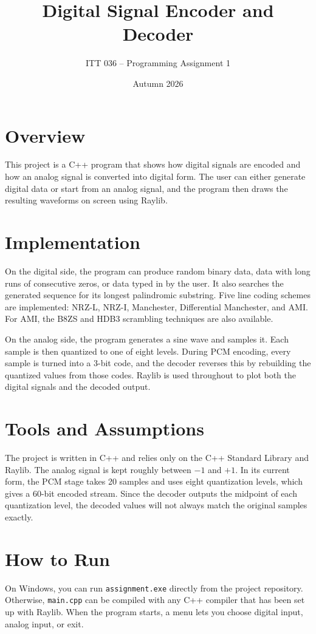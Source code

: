 \documentclass[10pt,a4paper]{article}
\title{\vspace{-1.5em}Digital Signal Encoder and Decoder}
\author{ITT 036 -- Programming Assignment 1}
\date{Autumn 2026}
\begin{document}
\maketitle
\vspace{-2em}

\section*{Overview}
This project is a C++ program that shows how digital signals are encoded
and how an analog signal is converted into digital form. The user can
either generate digital data or start from an analog signal, and the
program then draws the resulting waveforms on screen using Raylib.

\section*{Implementation}
On the digital side, the program can produce random binary data, data
with long runs of consecutive zeros, or data typed in by the user. It
also searches the generated sequence for its longest palindromic
substring. Five line coding schemes are implemented: NRZ-L, NRZ-I,
Manchester, Differential Manchester, and AMI. For AMI, the B8ZS and
HDB3 scrambling techniques are also available.

On the analog side, the program generates a sine wave and samples it.
Each sample is then quantized to one of eight levels. During PCM
encoding, every sample is turned into a 3-bit code, and the decoder
reverses this by rebuilding the quantized values from those codes.
Raylib is used throughout to plot both the digital signals and the
decoded output.

\section*{Tools and Assumptions}
The project is written in C++ and relies only on the C++ Standard
Library and Raylib. The analog signal is kept roughly between $-1$ and
$+1$. In its current form, the PCM stage takes 20 samples and uses
eight quantization levels, which gives a 60-bit encoded stream. Since
the decoder outputs the midpoint of each quantization level, the decoded
values will not always match the original samples exactly.

\section*{How to Run}
On Windows, you can run \texttt{assignment.exe} directly from the project
repository. Otherwise, \texttt{main.cpp} can be compiled with any C++
compiler that has been set up with Raylib. When the program starts, a
menu lets you choose digital input, analog input, or exit.
\end{document}
